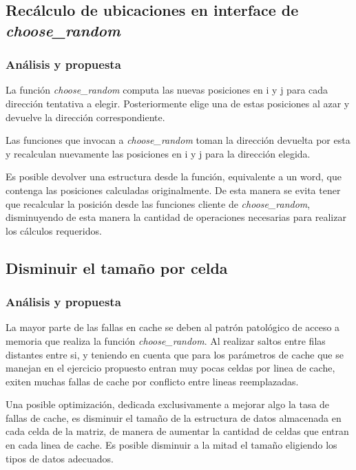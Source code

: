 \documentclass[a4paper,11pt]{article}
\begin{document}
\subsection{Recálculo de ubicaciones en interface de \textit{choose\_random}}

\subsubsection{Análisis y propuesta}

La función \textit{choose\_random} computa las nuevas posiciones en i y j para
cada dirección tentativa a elegir. Posteriormente elige una de estas posiciones
al azar y devuelve la dirección correspondiente.

Las funciones que invocan a \textit{choose\_random} toman la dirección devuelta
por esta y recalculan nuevamente las posiciones en i y j para la dirección
elegida.

Es posible devolver una estructura desde la función, equivalente a un word, que
contenga las posiciones calculadas originalmente. De esta manera se evita tener
que recalcular la posición desde las funciones cliente de
\textit{choose\_random}, disminuyendo de esta manera la cantidad de operaciones
necesarias para realizar los cálculos requeridos.

\subsection{Disminuir el tamaño por celda}

\subsubsection{Análisis y propuesta}

La mayor parte de las fallas en cache se deben al patrón patológico de acceso a
memoria que realiza la función \textit{choose\_random}. Al realizar saltos
entre filas distantes entre si, y teniendo en cuenta que para los parámetros de
cache que se manejan en el ejercicio propuesto entran muy pocas celdas por
linea de cache, exiten muchas fallas de cache por conflicto entre lineas
reemplazadas.

Una posible optimización, dedicada exclusivamente a mejorar algo la tasa de
fallas de cache, es disminuir el tamaño de la estructura de datos almacenada en
cada celda de la matriz, de manera de aumentar la cantidad de celdas que entran
en cada linea de cache. Es posible disminuir a la mitad el tamaño eligiendo los
tipos de datos adecuados.
\end{document}
